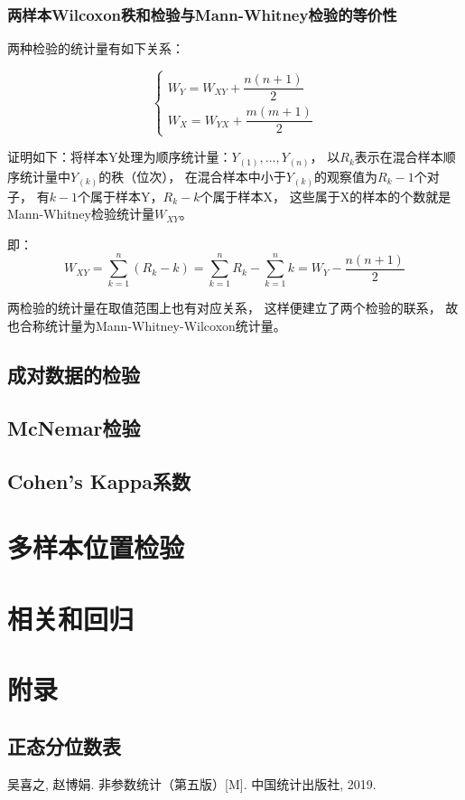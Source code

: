 \documentclass[UTF8]{ctexart}
\numberwithin{equation}{section}
\begin{document}
\subsubsection{两样本Wilcoxon秩和检验与Mann-Whitney检验的等价性}

两种检验的统计量有如下关系：

\begin{equation}
    \begin{cases}
        W_Y = W_{XY} + \dfrac{n(n+1)}{2} \\
        W_X = W_{YX} + \dfrac{m(m+1)}{2}
    \end{cases}
    \nonumber
\end{equation}

证明如下：将样本Y处理为顺序统计量：$Y_{(1)}, \dots, Y_{(n)}$，
以$R_k$表示在混合样本顺序统计量中$Y_{(k)}$的秩（位次），
在混合样本中小于$Y_{(k)}$的观察值为$R_k-1$个对子，
有$k-1$个属于样本Y，$R_k- k$个属于样本X，
这些属于X的样本的个数就是Mann-Whitney检验统计量$W_{XY}$。

即：
\begin{equation}
    W_{XY} = \sum_{k=1}^{n} (R_k - k) = \sum_{k=1}^{n} R_k - \sum_{k=1}^{n} k = W_Y - \dfrac{n(n+1)}{2}
    \nonumber
\end{equation}

两检验的统计量在取值范围上也有对应关系，
这样便建立了两个检验的联系，
故也合称统计量为Mann-Whitney-Wilcoxon统计量。


\subsection{成对数据的检验}

\subsection{McNemar检验}

\subsection{Cohen's Kappa系数}


\clearpage
\section{多样本位置检验}

\clearpage
\section{相关和回归}

\clearpage
\section*{附录}
\subsection*{正态分位数表}

\clearpage

\begin{thebibliography}{99}
     吴喜之, 赵博娟. 非参数统计（第五版）[M]. 中国统计出版社, 2019.
\end{thebibliography}
\end{document}
